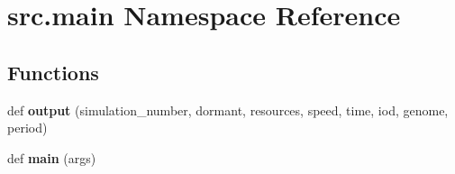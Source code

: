 \hypertarget{namespacesrc_1_1main}{}\section{src.\+main Namespace Reference}
\label{namespacesrc_1_1main}
\subsection*{Functions}
\begin{DoxyCompactItemize}
\item 
\mbox{\label{namespacesrc_1_1main_a9ceee1b996bca3c451b0616c425364a8}} 
def {\bfseries output} (simulation\+\_\+number, dormant, resources, speed, time, iod, genome, period)
\item 
\mbox{\label{namespacesrc_1_1main_a122d385c098589d417a587e18a75ea7b}} 
def {\bfseries main} (args)
\end{DoxyCompactItemize}
